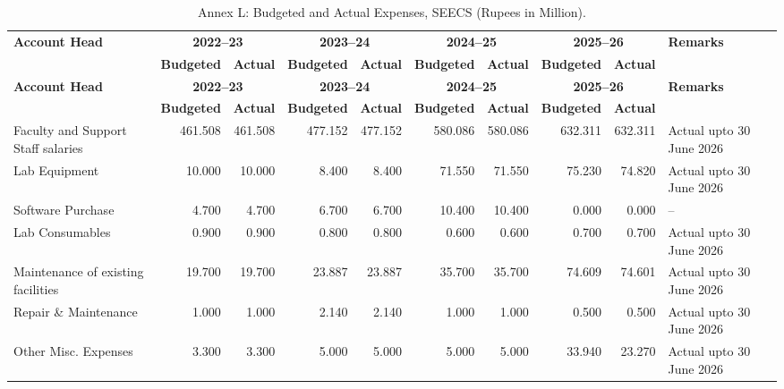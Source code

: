 \begin{landscape}
\begin{longtable}{p{4.4cm}rrrrrrrrp{3.2cm}}
\caption{Annex L: Budgeted and Actual Expenses, SEECS (Rupees in Million).}\label{tab:annexL_expenses}\\
\toprule
\textbf{Account Head} & \multicolumn{2}{c}{\textbf{2022--23}} & \multicolumn{2}{c}{\textbf{2023--24}} & \multicolumn{2}{c}{\textbf{2024--25}} & \multicolumn{2}{c}{\textbf{2025--26}} & \textbf{Remarks} \\
\cmidrule(lr){2-3}\cmidrule(lr){4-5}\cmidrule(lr){6-7}\cmidrule(lr){8-9}
& \textbf{Budgeted} & \textbf{Actual} & \textbf{Budgeted} & \textbf{Actual} & \textbf{Budgeted} & \textbf{Actual} & \textbf{Budgeted} & \textbf{Actual} & \\
\midrule
\endfirsthead
\toprule
\textbf{Account Head} & \multicolumn{2}{c}{\textbf{2022--23}} & \multicolumn{2}{c}{\textbf{2023--24}} & \multicolumn{2}{c}{\textbf{2024--25}} & \multicolumn{2}{c}{\textbf{2025--26}} & \textbf{Remarks} \\
\cmidrule(lr){2-3}\cmidrule(lr){4-5}\cmidrule(lr){6-7}\cmidrule(lr){8-9}
& \textbf{Budgeted} & \textbf{Actual} & \textbf{Budgeted} & \textbf{Actual} & \textbf{Budgeted} & \textbf{Actual} & \textbf{Budgeted} & \textbf{Actual} & \\
\midrule
\endhead
Faculty and Support Staff salaries & 461.508 & 461.508 & 477.152 & 477.152 & 580.086 & 580.086 & 632.311 & 632.311 & Actual upto 30 June 2026 \\
Lab Equipment & 10.000 & 10.000 & 8.400 & 8.400 & 71.550 & 71.550 & 75.230 & 74.820 & Actual upto 30 June 2026 \\
Software Purchase & 4.700 & 4.700 & 6.700 & 6.700 & 10.400 & 10.400 & 0.000 & 0.000 & -- \\
Lab Consumables & 0.900 & 0.900 & 0.800 & 0.800 & 0.600 & 0.600 & 0.700 & 0.700 & Actual upto 30 June 2026 \\
Maintenance of existing facilities & 19.700 & 19.700 & 23.887 & 23.887 & 35.700 & 35.700 & 74.609 & 74.601 & Actual upto 30 June 2026 \\
Repair \& Maintenance & 1.000 & 1.000 & 2.140 & 2.140 & 1.000 & 1.000 & 0.500 & 0.500 & Actual upto 30 June 2026 \\
Other Misc. Expenses & 3.300 & 3.300 & 5.000 & 5.000 & 5.000 & 5.000 & 33.940 & 23.270 & Actual upto 30 June 2026 \\
\bottomrule
\end{longtable}
\end{landscape}
